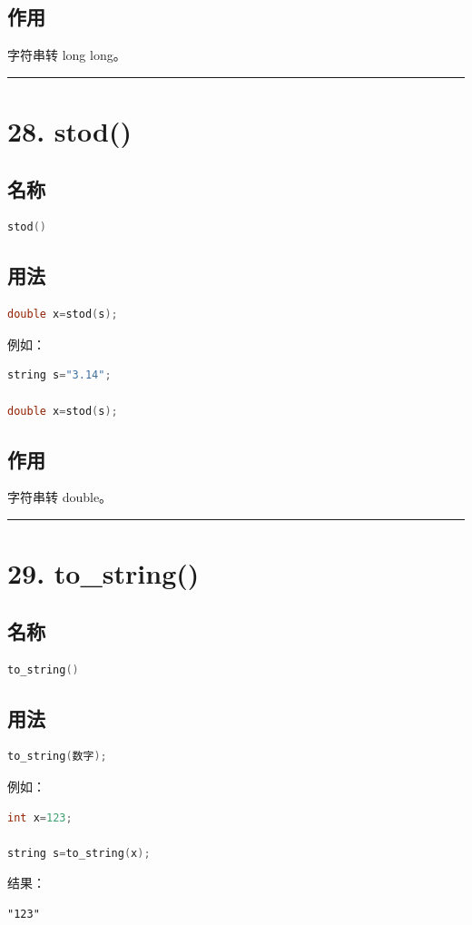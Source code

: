 \documentclass[9pt,twocolumn]{extarticle}
\begin{document}
\subsection{作用}
字符串转 long long。

\noindent\rule{\linewidth}{0.4pt}

\section{28. stod()}

\subsection{名称}
\begin{lstlisting}[language=C++]
stod()
\end{lstlisting}

\subsection{用法}
\begin{lstlisting}[language=C++]
double x=stod(s);
\end{lstlisting}
例如：
\begin{lstlisting}[language=C++]
string s="3.14";

double x=stod(s);
\end{lstlisting}

\subsection{作用}
字符串转 double。

\noindent\rule{\linewidth}{0.4pt}

\section{29. to\_string()}

\subsection{名称}
\begin{lstlisting}[language=C++]
to_string()
\end{lstlisting}

\subsection{用法}
\begin{lstlisting}[language=C++]
to_string(数字);
\end{lstlisting}
例如：
\begin{lstlisting}[language=C++]
int x=123;

string s=to_string(x);
\end{lstlisting}
结果：
\begin{lstlisting}
"123"
\end{lstlisting}
\end{document}
